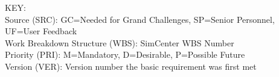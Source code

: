 \noindent
KEY:\\
Source (SRC): GC=Needed for Grand Challenges, SP=Senior Personnel, UF=User Feedback \\
Work Breakdown Structure (WBS): SimCenter WBS  Number \\
Priority (PRI): M=Mandatory, D=Desirable, P=Possible Future \\
Version (VER): Version number the basic requirement was first met 
